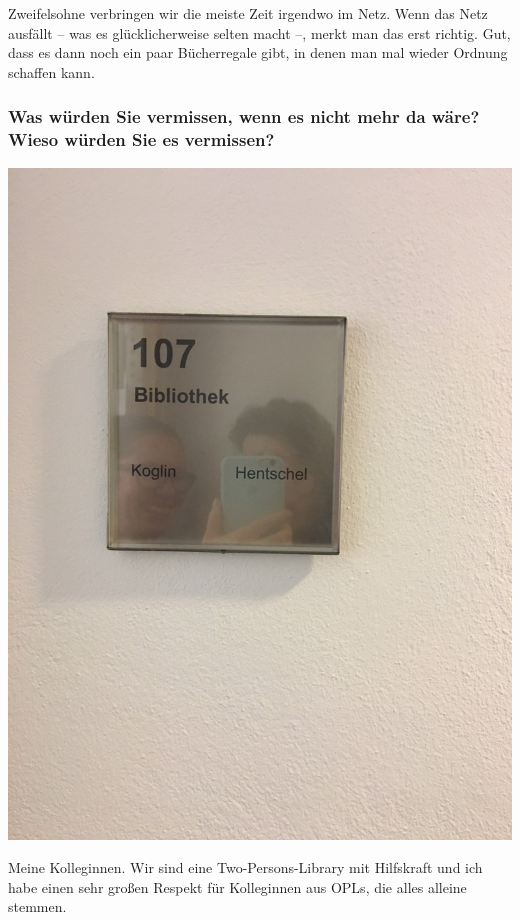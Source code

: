 Zweifelsohne verbringen wir die meiste Zeit irgendwo im Netz. Wenn das
Netz ausfällt -- was es glücklicherweise selten macht --, merkt man das
erst richtig. Gut, dass es dann noch ein paar Bücherregale gibt, in
denen man mal wieder Ordnung schaffen kann.

\hypertarget{was-wuxfcrden-sie-vermissen-wenn-es-nicht-mehr-da-wuxe4re-wieso-wuxfcrden-sie-es-vermissen}{%
\subsubsection*{Was würden Sie vermissen, wenn es nicht mehr da wäre? Wieso
würden Sie es
vermissen?}\label{was-wuxfcrden-sie-vermissen-wenn-es-nicht-mehr-da-wuxe4re-wieso-wuxfcrden-sie-es-vermissen}}

\begin{center}
\includegraphics{igb/img/bibliothek.jpg}
\end{center}

Meine Kolleginnen. Wir sind eine Two-Persons-Library mit Hilfskraft und
ich habe einen sehr großen Respekt für Kolleginnen aus OPLs, die alles
alleine stemmen.

